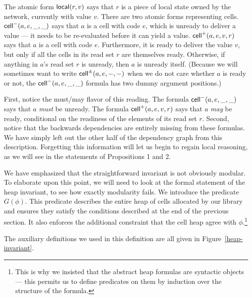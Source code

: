 \documentclass[natbib]{sigplanconf}
\begin{document}
The atomic form $\mbox{\textsf{{local}}}({r}, {v})$ says that $r$ is a piece of local
state owned by the network, currently with value $v$. There are two
atomic forms representing cells. $\mbox{\textsf{{cell}}}^{-}({a}, {e}, {\_}, {\_})$ says that $a$ is a
cell with code $e$, which is unready to deliver a value --- it needs
to be re-evaluated before it can yield a value. $\mbox{\textsf{{cell}}}^{+}({a}, {e}, {v}, {r})$
says that $a$ is a cell with code $e$. Furthermore, it is ready to
deliver the value $v$, but only if all the cells in its read set $r$
are themselves ready. Otherwise, if anything in $a$'s read set $r$ is 
unready, then $a$ is unready itself. (Because we will sometimes want to
write $\mbox{\textsf{{cell}}}^{\pm}({a}, {e}, {-}, {-})$ when we do not care whether $a$ is ready or
not, the $\mbox{\textsf{{cell}}}^{-}({a}, {e}, {\_}, {\_})$ formula has two dummy argument positions.)

First, notice the must/may flavor of this reading. The formula
$\mbox{\textsf{{cell}}}^{-}({a}, {e}, {\_}, {\_})$ says that $a$ \emph{must} be unready.  The formula
$\mbox{\textsf{{cell}}}^{+}({a}, {e}, {v}, {r})$ says that $a$ \emph{may} be ready, conditional
on the readiness of the elements of its read set $r$. Second, notice
that the backwards dependencies are entirely missing from these
formulas. We have simply left out the other half of the dependency
graph from this description. Forgetting this information will let us
begin to regain local reasoning, as we will see in the statements
of Propositions 1 and 2. 

We have emphasized that the straightforward invariant is not obviously
modular. To elaborate upon this point, we will need to look at the
formal statement of the heap invariant, to see how exactly modularity
fails. We introduce the predicate $G(\phi)$. This predicate describes
the entire heap of cells allocated by our library and ensures they
satisfy the conditions described at the end of the previous
section. It also enforces the additional constraint that the cell heap
agree with $\phi$.\footnote{This is why we insisted that the abstract
  heap formulas are syntactic objects --- this permits us to define
  predicates on them by induction over the structure of the formula.}
The auxiliary definitions we used in this definition are all given in
Figure~\ref{heap-invariant}. 
\end{document}
